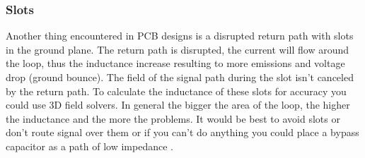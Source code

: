 \documentclass[final]{cubedoc}
\begin{document}
	
	
	\subsubsection{Slots}
	
	Another thing encountered in PCB designs is a disrupted return path with slots in the ground plane. The return path is disrupted, the current will flow around the loop, thus the inductance increase resulting to more emissions and voltage drop (ground bounce). The field of the signal path during the slot isn't canceled by the return path. To calculate the inductance of these slots for accuracy you could use 3D field solvers. In general the bigger the area of the loop, the higher the inductance and the more the problems. It would be best to avoid slots or don't route signal over them or if you can't do anything you could place a bypass capacitor as a path of low impedance \cite{stackexchange:radiation, brooks2003signal}.
	
	
	
\end{document}
